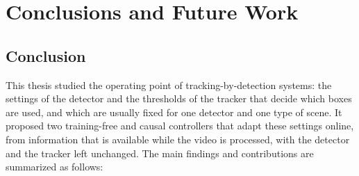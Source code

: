 \chapter{Conclusions and Future Work}\label{ch:conclusions}

\section{Conclusion}\label{sec:conc-conclusion}
This thesis studied the operating point of tracking-by-detection systems: the settings of the detector and the thresholds of the tracker that decide which boxes are used, and which are usually fixed for one detector and one type of scene. It proposed two training-free and causal controllers that adapt these settings online, from information that is available while the video is processed, with the detector and the tracker left unchanged. The main findings and contributions are summarized as follows:
